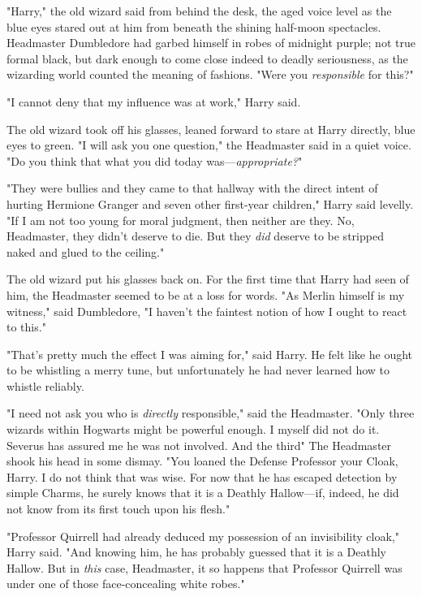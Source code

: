 "Harry," the old wizard said from behind the desk, the aged voice level as the
blue eyes stared out at him from beneath the shining half-moon spectacles.
Headmaster Dumbledore had garbed himself in robes of midnight purple; not true
formal black, but dark enough to come close indeed to deadly seriousness, as
the wizarding world counted the meaning of fashions. "Were you{\el}
\emph{responsible} for this?"

"I cannot deny that my influence was at work," Harry said.

The old wizard took off his glasses, leaned forward to stare at Harry directly,
blue eyes to green. "I will ask you one question," the Headmaster said in a
quiet voice. "Do you think that what you did today was—\emph{appropriate?}"

"They were bullies and they came to that hallway with the direct intent of
hurting Hermione Granger and seven other first-year children," Harry said
levelly. "If I am not too young for moral judgment, then neither are they. No,
Headmaster, they didn't deserve to die. But they \emph{did} deserve to be
stripped naked and glued to the ceiling."

The old wizard put his glasses back on. For the first time that Harry had seen
of him, the Headmaster seemed to be at a loss for words. "As Merlin himself is
my witness," said Dumbledore, "I haven't the faintest notion of how I ought to
react to this."

"That's pretty much the effect I was aiming for," said Harry. He felt like he
ought to be whistling a merry tune, but unfortunately he had never learned how
to whistle reliably.

"I need not ask you who is \emph{directly} responsible," said the Headmaster.
"Only three wizards within Hogwarts might be powerful enough. I myself did not
do it. Severus has assured me he was not involved. And the third{\el}" The
Headmaster shook his head in some dismay. "You loaned the Defense Professor
your Cloak, Harry. I do not think that was wise. For now that he has escaped
detection by simple Charms, he surely knows that it is a Deathly Hallow—if,
indeed, he did not know from its first touch upon his flesh."

"Professor Quirrell had already deduced my possession of an invisibility
cloak," Harry said. "And knowing him, he has probably guessed that it is a
Deathly Hallow. But in \emph{this} case, Headmaster, it so happens that
Professor Quirrell was under one of those face-concealing white robes."

